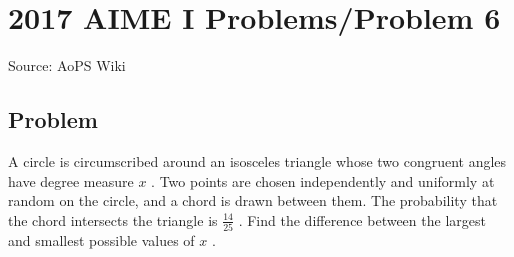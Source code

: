 \documentclass[12pt]{article}
\begin{document}
\section*{{2017 AIME I Problems/Problem 6}}
Source: AoPS Wiki

\subsection*{Problem}
A circle is circumscribed around an isosceles triangle whose two congruent angles have degree measure $x$ . Two points are chosen independently and uniformly at random on the circle, and a chord is drawn between them. The probability that the chord intersects the triangle is $\frac{14}{25}$ . Find the difference between the largest and smallest possible values of $x$ .
\end{document}
